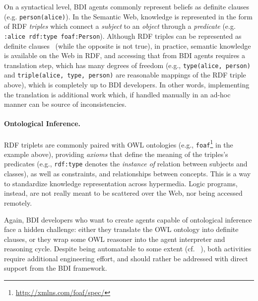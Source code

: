 On a syntactical level,
\ac{BDI} agents commonly represent beliefs as definite clauses~\cite{MAKOWSKY1987266}
(e.g. \texttt{person(alice)}).
%
In the Semantic Web,
knowledge is represented in the form of \ac{RDF} \emph{triples} which connect a \emph{subject} to an \emph{object} through a \emph{predicate} (e.g. \texttt{:alice rdf:type foaf:Person}).
%
Although \ac{RDF} triples can be represented as definite clauses~\cite{DBLP:conf/www/GrosofHVD03}
(while the opposite is not true),
in practice,
semantic knowledge is available on the Web in \ac{RDF},
and accessing that from \ac{BDI} agents requires a translation step,
which has many degrees of freedom
(e.g., \texttt{type(alice, person)} and \texttt{triple(alice, type, person)} are reasonable mappings of the \ac{RDF} triple above),
which is completely up to \ac{BDI} developers.
%
In other words,
implementing the translation is additional work which, if handled manually in an ad-hoc manner can be source of inconsistencies.

\paragraph{Ontological Inference.}

\ac{RDF} triplets are commonly paired with \ac{OWL} ontologies (e.g., \texttt{foaf}\footnote{\url{http://xmlns.com/foaf/spec/}} in the example above),
providing \emph{axioms} that define the meaning of the triples's predicates
(e.g., \texttt{rdf:type} denotes the \emph{instance of} relation between subjects and classes),
as well as constraints, and relationships between concepts.
%
This is a way to standardize knowledge representation across hypermedia.
%
Logic programs, instead, are not really meant to be scattered over the Web,
nor being accessed remotely.

Again,
\ac{BDI} developers who want to create agents capable of ontological inference face a hidden challenge:
either they translate the \ac{OWL} ontology into definite clauses,
or they wrap some \ac{OWL} reasoner into the agent interpreter and reasoning cycle.
%
Despite being automatable to some extent (cf. ~\cite{samuel2008tplp}),
both activities require additional engineering effort,
and should rather be addressed with direct support from the \ac{BDI} framework.

